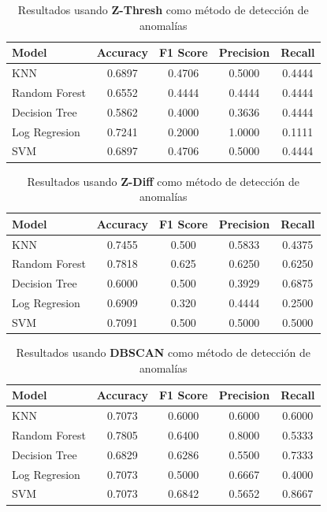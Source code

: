	\begin{table}[htb]
		\centering
		\caption{Resultados usando \textbf{Z-Thresh} como método de detección de anomalías}
		\label{table:13}
		\begin{tabular}{lcccc}
		\toprule
				Model &  Accuracy &  F1 Score &  Precision &  Recall \\
		\midrule
				  KNN &    0.6897 &    0.4706 &     0.5000 &  0.4444 \\
		Random Forest &    0.6552 &    0.4444 &     0.4444 &  0.4444 \\
		Decision Tree &    0.5862 &    0.4000 &     0.3636 &  0.4444 \\
		Log Regresion &    0.7241 &    0.2000 &     1.0000 &  0.1111 \\
				  SVM &    0.6897 &    0.4706 &     0.5000 &  0.4444 \\
		\bottomrule
		\end{tabular}
	\end{table}

	\begin{table}[htb]
		\centering
		\caption{Resultados usando \textbf{Z-Diff} como método de detección de anomalías}
		\label{table:14}
		\begin{tabular}{lcccc}
		\toprule
				Model &  Accuracy &  F1 Score &  Precision &  Recall \\
		\midrule
				  KNN &    0.7455 &     0.500 &     0.5833 &  0.4375 \\
		Random Forest &    0.7818 &     0.625 &     0.6250 &  0.6250 \\
		Decision Tree &    0.6000 &     0.500 &     0.3929 &  0.6875 \\
		Log Regresion &    0.6909 &     0.320 &     0.4444 &  0.2500 \\
				  SVM &    0.7091 &     0.500 &     0.5000 &  0.5000 \\
		\bottomrule
		\end{tabular}
	\end{table}

	\begin{table}[htb]
		\centering
		\caption{Resultados usando \textbf{DBSCAN} como método de detección de anomalías}
		\label{table:15}
		\begin{tabular}{lcccc}
		\toprule
				Model &  Accuracy &  F1 Score &  Precision &  Recall \\
		\midrule
				  KNN &    0.7073 &    0.6000 &     0.6000 &  0.6000 \\
		Random Forest &    0.7805 &    0.6400 &     0.8000 &  0.5333 \\
		Decision Tree &    0.6829 &    0.6286 &     0.5500 &  0.7333 \\
		Log Regresion &    0.7073 &    0.5000 &     0.6667 &  0.4000 \\
				  SVM &    0.7073 &    0.6842 &     0.5652 &  0.8667 \\
		\bottomrule
		\end{tabular}
	\end{table}

